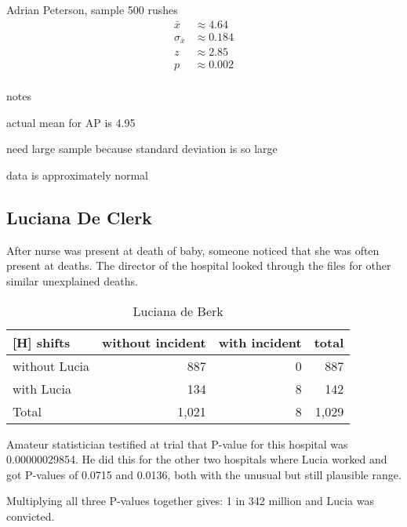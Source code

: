 \documentclass[landscape]{exam}
\begin{document}
  Adrian Peterson, sample 500 rushes
  \begin{align*}
    \bar{x}          & \approx 4.64 \\
    \sigma_{\bar{x}} & \approx 0.184 \\
    z                & \approx 2.85 \\
    p                & \approx 0.002 \\
  \end{align*}

  notes
  \begin{itemize*}
    \item actual mean for AP is 4.95
    \item need large sample because standard deviation is so large
    \item data is approximately normal
  \end{itemize*}

  \subsection{Luciana De Clerk}

  After nurse was present at death of baby, someone noticed that she was often
  present at deaths. The director of the hospital looked through the files for
  other similar unexplained deaths. 

  \begin{table}
    \centering
    \begin{tabular}{lrrr}[H]
      \toprule
      shifts        & without incident & with incident & total \\
      \midrule
      without Lucia & 887              & 0             & 887 \\
      with Lucia    & 134              & 8             & 142 \\
      Total         & 1,021            & 8             & 1,029 \\
      \bottomrule
    \end{tabular}
    \caption{Luciana de Berk}
    \label{tab:ldb1}
  \end{table}

  Amateur statistician testified at trial that P-value for this hospital was
  0.00000029854. He did this for the other two hospitals where Lucia worked and
  got P-values of 0.0715 and 0.0136, both with the unusual but still plausible
  range.

  Multiplying all three P-values together gives: 1 in 342 million and Lucia was
  convicted.
\end{document}
